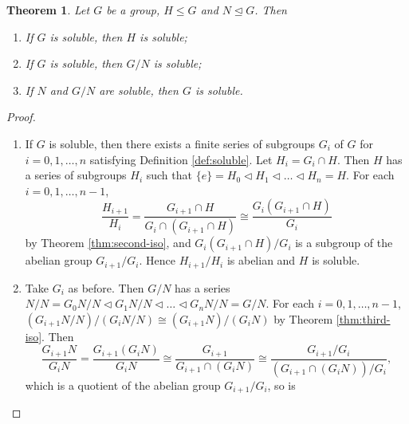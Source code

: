 \documentclass[12pt]{article}
\newtheorem{theorem}{Theorem}
\begin{document}
\begin{theorem} \label{thm:soluble-main}
    Let $G$ be a group, $H \le G$ and $N \trianglelefteq G$. Then
    \begin{enumerate}
        \item If $G$ is soluble, then $H$ is soluble;
        \item If $G$ is soluble, then $G / N$ is soluble;
        \item If $N$ and $G / N$ are soluble, then $G$ is soluble.
    \end{enumerate}
\end{theorem}
\begin{proof}
    \begin{enumerate}
        \item If $G$ is soluble, then there exists a finite series of subgroups
              $G_i$ of $G$ for $i = 0, 1, \dots, n$ satisfying Definition
              \ref{def:soluble}.
              Let $H_i = G_i \cap H$. Then $H$ has a series of subgroups $H_i$
              such that $\{
                  e \} = H_0 \triangleleft H_1 \triangleleft \dots
                  \triangleleft H_n = H.$
              For each $i = 0, 1, \dots, n - 1$,
              $$
                  \frac{H_{i+1}}{H_i}
                  = \frac{G_{i+1} \cap H}{G_i \cap (G_{i+1} \cap H)}
                  \cong \frac{G_i(G_{i+1} \cap H)} {G_i}
              $$
              by Theorem \ref{thm:second-iso}, and ${G_i(G_{i+1} \cap
                          H)}/{G_i}$ is a
              subgroup of the abelian group $G_{i+1} / G_{i}$. Hence $H_{i+1} /
                  H_{i}$ is
              abelian and $H$ is soluble.
        \item Take $G_i$ as before. Then $G / N$ has a series
              $N/N = G_0 N / N \triangleleft G_1 N / N \triangleleft \dots
                  \triangleleft G_n N / N  =  G / N. $
              For each $i = 0, 1, \dots, n - 1$,
              $(G_{i+1} N / N) / (G_{i} N / N) \cong (G_{i+1} N) / (G_i N)$
              by Theorem \ref{thm:third-iso}. Then
              $$
                  \frac{G_{i+1} N}{G_i N} =\frac{G_{i+1}\left(G_i N\right)}{G_i
                      N} \cong
                  \frac{G_{i+1}}{G_{i+1} \cap\left(G_i N\right)} \cong
                  \frac{G_{i+1} /
                      G_i}{\left(G_{i+1} \cap\left(G_i N\right)\right) / G_i},
              $$
              which is a quotient of the abelian group $G_{i+1} / G_i$, so is

\end{enumerate}
\end{proof}
\end{document}

